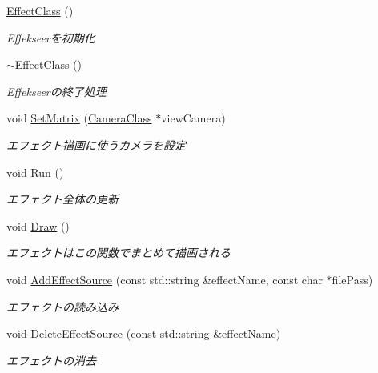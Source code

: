 \begin{DoxyCompactItemize}
\item 
\mbox{\hyperlink{class_k___graphics_1_1_effect_class_a33755c964db87d459d46c28788b19dd2}{Effect\+Class}} ()
\begin{DoxyCompactList}\small\item\em Effekseerを初期化 \end{DoxyCompactList}\item 
\mbox{\hyperlink{class_k___graphics_1_1_effect_class_ab51e3f43095aac4bb6f7826254c4723b}{$\sim$\+Effect\+Class}} ()
\begin{DoxyCompactList}\small\item\em Effekseerの終了処理 \end{DoxyCompactList}\item 
void \mbox{\hyperlink{class_k___graphics_1_1_effect_class_ac23549936fee9b53059d94dfd0679413}{Set\+Matrix}} (\mbox{\hyperlink{class_k___graphics_1_1_camera_class}{Camera\+Class}} $\ast$view\+Camera)
\begin{DoxyCompactList}\small\item\em エフェクト描画に使うカメラを設定 \end{DoxyCompactList}\item 
void \mbox{\hyperlink{class_k___graphics_1_1_effect_class_a60605a1855dbfc6ce6a97b7014a148c0}{Run}} ()
\begin{DoxyCompactList}\small\item\em エフェクト全体の更新 \end{DoxyCompactList}\item 
void \mbox{\hyperlink{class_k___graphics_1_1_effect_class_aee527e320342f218b88293f41beec6e7}{Draw}} ()
\begin{DoxyCompactList}\small\item\em エフェクトはこの関数でまとめて描画される \end{DoxyCompactList}\item 
void \mbox{\hyperlink{class_k___graphics_1_1_effect_class_acdb2dd81e2e0877e42aff4d5b543b684}{Add\+Effect\+Source}} (const std\+::string \&effect\+Name, const char $\ast$file\+Pass)
\begin{DoxyCompactList}\small\item\em エフェクトの読み込み \end{DoxyCompactList}\item 
void \mbox{\hyperlink{class_k___graphics_1_1_effect_class_abe5a20c2680329b045d3a60dddb886ed}{Delete\+Effect\+Source}} (const std\+::string \&effect\+Name)
\begin{DoxyCompactList}\small\item\em エフェクトの消去 \end{DoxyCompactList}\item 

\end{DoxyCompactItemize}
